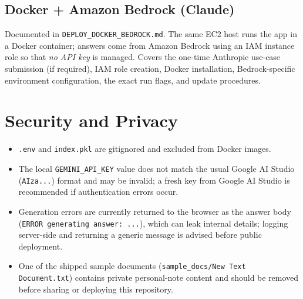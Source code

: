 \documentclass[11pt,a4paper]{article}
\newcommand{\code}[1]{\texttt{#1}}
\begin{document}
\subsection{Docker + Amazon Bedrock (Claude)}
Documented in \code{DEPLOY\_DOCKER\_BEDROCK.md}. The same EC2 host runs the
app in a Docker container; answers come from Amazon Bedrock using an IAM
instance role so that \emph{no API key} is managed. Covers the one-time
Anthropic use-case submission (if required), IAM role creation, Docker
installation, Bedrock-specific environment configuration, the exact run
flags, and update procedures.

\section{Security and Privacy}
\begin{itemize}
  \item \code{.env} and \code{index.pkl} are gitignored and excluded from
        Docker images.
  \item The local \code{GEMINI\_API\_KEY} value does not match the usual
        Google AI Studio (\code{AIza...}) format and may be invalid;
        a fresh key from Google AI Studio is recommended if authentication
        errors occur.
  \item Generation errors are currently returned to the browser as the
        answer body (\code{ERROR generating answer: ...}), which can leak
        internal details; logging server-side and returning a generic message
        is advised before public deployment.
  \item One of the shipped sample documents
        (\code{sample\_docs/New Text Document.txt}) contains private
        personal-note content and should be removed before sharing or
        deploying this repository.
\end{itemize}

\end{document}
